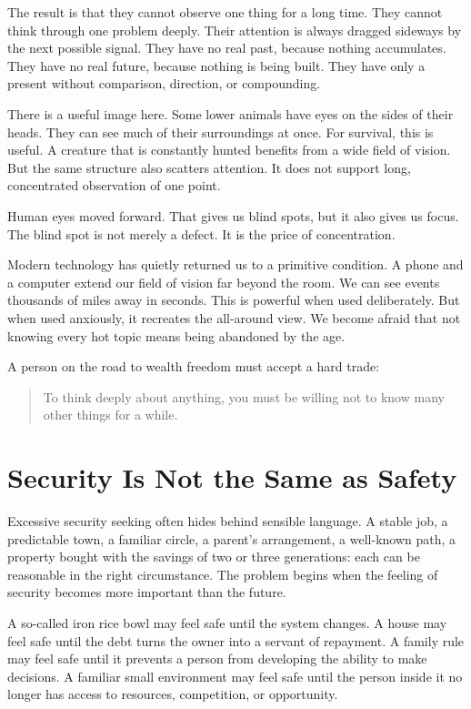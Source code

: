 The result is that they cannot observe one thing for a long time. They cannot think through one problem deeply. Their attention is always dragged sideways by the next possible signal. They have no real past, because nothing accumulates. They have no real future, because nothing is being built. They have only a present without comparison, direction, or compounding.

There is a useful image here. Some lower animals have eyes on the sides of their heads. They can see much of their surroundings at once. For survival, this is useful. A creature that is constantly hunted benefits from a wide field of vision. But the same structure also scatters attention. It does not support long, concentrated observation of one point.

Human eyes moved forward. That gives us blind spots, but it also gives us focus. The blind spot is not merely a defect. It is the price of concentration.

Modern technology has quietly returned us to a primitive condition. A phone and a computer extend our field of vision far beyond the room. We can see events thousands of miles away in seconds. This is powerful when used deliberately. But when used anxiously, it recreates the all-around view. We become afraid that not knowing every hot topic means being abandoned by the age.

A person on the road to wealth freedom must accept a hard trade:

\begin{quote}
To think deeply about anything, you must be willing not to know many other things for a while.
\end{quote}

\section*{Security Is Not the Same as Safety}

Excessive security seeking often hides behind sensible language. A stable job, a predictable town, a familiar circle, a parent's arrangement, a well-known path, a property bought with the savings of two or three generations: each can be reasonable in the right circumstance. The problem begins when the feeling of security becomes more important than the future.

A so-called iron rice bowl may feel safe until the system changes. A house may feel safe until the debt turns the owner into a servant of repayment. A family rule may feel safe until it prevents a person from developing the ability to make decisions. A familiar small environment may feel safe until the person inside it no longer has access to resources, competition, or opportunity.


